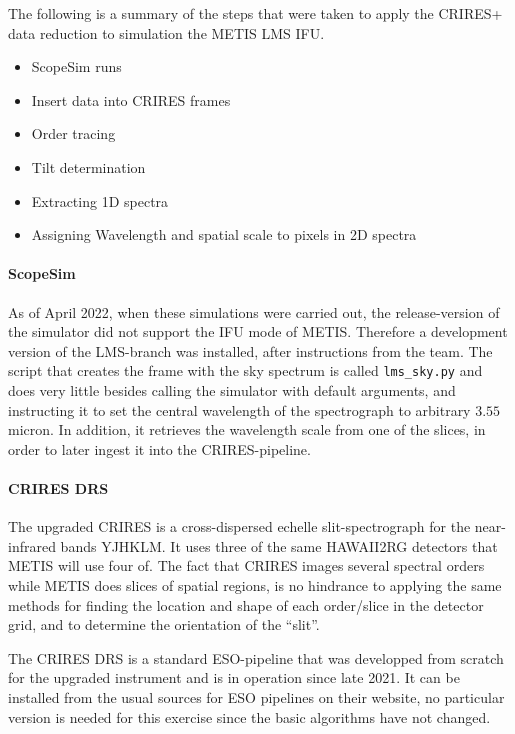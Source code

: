 The following is a summary of the steps that were taken to apply the
CRIRES+ data reduction to simulation the METIS LMS IFU.
\begin{itemize}
    \item ScopeSim runs
    \item Insert data into CRIRES frames
    \item Order tracing
    \item Tilt determination
    \item Extracting 1D spectra
    \item Assigning Wavelength and spatial scale to pixels in 2D spectra
\end{itemize}

\paragraph{ScopeSim}
As of April 2022, when these simulations were carried out, the
release-version of the simulator did not support the IFU mode of METIS.
Therefore a development version of the LMS-branch was installed, after
instructions from the team. The script
that creates the frame with the sky spectrum is called
\texttt{lms\_sky.py} and does very little besides calling the simulator
with default arguments, and instructing it to set the central wavelength
of the spectrograph to arbitrary $3.55$ micron. In addition, it retrieves
the wavelength scale from one of the slices, in order to later ingest it
into the CRIRES-pipeline.

\paragraph{CRIRES DRS}
The upgraded CRIRES is a cross-dispersed echelle slit-spectrograph for
the near-infrared bands YJHKLM. It uses three of the same HAWAII2RG
detectors that METIS will use four of. The fact that CRIRES images
several spectral orders while METIS does slices of spatial regions, is
no hindrance to applying the same methods for finding the location and
shape of each order/slice in the detector grid, and to determine the
orientation of the ``slit''.

The CRIRES DRS is a standard ESO-pipeline that was developped from
scratch for the upgraded instrument and is in operation since late 2021.
It can be installed from the usual sources for ESO pipelines on their
website, no particular version is needed for this exercise since the
basic algorithms have not changed.

